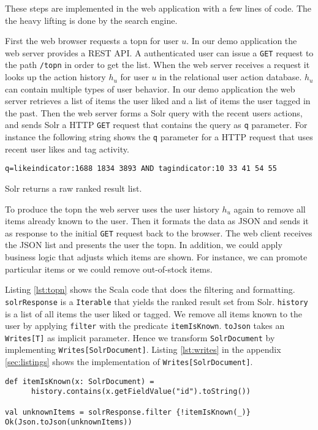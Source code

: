 These steps are implemented in the web application with a few lines of code. The the heavy lifting is done by the search engine.

First the web browser requests a \gls{topn} for user $u$. In our demo application the web server provides a REST API. A authenticated user can issue a \verb|GET| request to the path \verb|/topn| in order to get the list. 
When the web server receives a request it looks up the action history $h_u$ for user $u$ in the relational user action database. $h_u$ can contain multiple types of user behavior. In our demo application the web server retrieves a list of items the user liked and a list of items the user tagged in the past.
Then the web server forms a Solr query with the recent users actions, and sends Solr a HTTP \verb|GET| request that contains the query as \verb|q| parameter. For instance the following string shows the \verb|q| parameter for a HTTP request that uses recent user likes and tag activity.
\begin{verbatim}
q=likeindicator:1688 1834 3893 AND tagindicator:10 33 41 54 55 
\end{verbatim}
Solr returns a raw ranked result list. 

To produce the \gls{topn} the web server uses the user history $h_u$ again to remove all items already known to the user. Then it formats the data as JSON and sends it as response to the initial \verb|GET| request back to the browser. The web client receives the JSON list and presents the user the \gls{topn}. In addition, we could apply business logic that adjusts which items are shown. For instance, we can promote particular items or we could remove out-of-stock items.

Listing \ref{lst:topn} shows the Scala code that does the filtering and formatting.
\verb|solrResponse| is a \verb|Iterable| that yields the ranked result set from Solr. \verb|history| is a list of all items the user liked or tagged. We remove all items known to the user by applying \verb|filter| with the predicate \verb|itemIsKnown|. \verb|toJson| takes an \verb|Writes[T]| as implicit parameter. Hence we transform \verb|SolrDocument| by implementing \verb|Writes[SolrDocument]|. Listing \ref{lst:writes} in the appendix \ref{sec:listings} shows the implementation of \verb|Writes[SolrDocument]|.

\begin{lstlisting}[caption={The web server removes items already known and formats the the items in JSON},label={lst:topn}]
def itemIsKnown(x: SolrDocument) =
      history.contains(x.getFieldValue("id").toString())
      
val unknownItems = solrResponse.filter {!itemIsKnown(_)}
Ok(Json.toJson(unknownItems))
\end{lstlisting}

